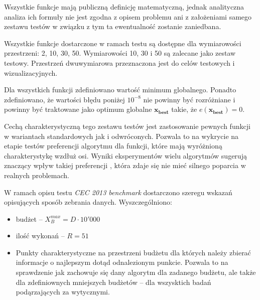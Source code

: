 \documentclass[12pt,a4paper]{report}
\begin{document}
{{{{{Wszystkie funkcje mają publiczną definicję matematyczną, jednak analityczna analiza ich formuły nie jest zgodna z opisem problemu ani z założeniami samego zestawu testów w związku z tym ta ewentualność zostanie zaniedbana.
}
\par{
Wszystkie funkcje dostarczone w ramach testu są dostępne dla wymiarowości przestrzeni: 2, 10, 30, 50. Wymiarowości 10, 30 i 50 są zalecane jako zestaw testowy. Przestrzeń dwuwymiarowa przeznaczona jest do celów testowych i wizualizacyjnych.
}
\par{
Dla wszystkich funkcji zdefiniowano wartość minimum globalnego. Ponadto zdefiniowano, że wartości błędu poniżej $10^{-8}$ nie powinny być rozróżniane i powinny być traktowane jako optimum globalne $\mathbf{x_{best}}$ takie, że $e(\mathbf{x_{best}}) = 0$.
}
\par{
Cechą charakterystyczną tego zestawu testów jest zastosowanie pewnych funkcji w wariantach standardowych jak i odwróconych. Pozwala to na wykrycie na etapie testów preferencji algorytmu dla funkcji, które mają wyróżnioną charakterystykę wzdłuż osi. Wyniki eksperymentów wielu algorytmów sugerują znaczący wpływ takiej preferencji \cite{JADE,SHADE}, która zdaje się nie mieć silnego poparcia w realnych problemach.
}
\par{
W ramach opisu testu \emph{CEC 2013 benchmark} dostarczono szeregu wskazań opisujących sposób zebrania danych. Wyszczególniono:
\begin{itemize}
\item budżet -- $X_B^{max} = D \cdot 10'000$
\item ilość wykonań -- $R = 51$
\item Punkty charakterystyczne na przestrzeni budżetu dla których należy zbierać informacje o najlepszym dotąd odnalezionym punkcie. Pozwala to na sprawdzenie jak zachowuje się dany algorytm dla zadanego budżetu, ale także dla zdefiniownych mniejszych budżetów -- dla wszysktich badań podąrzających za wytycznymi.
\end {itemize}
}

}}}}
\end{document}
